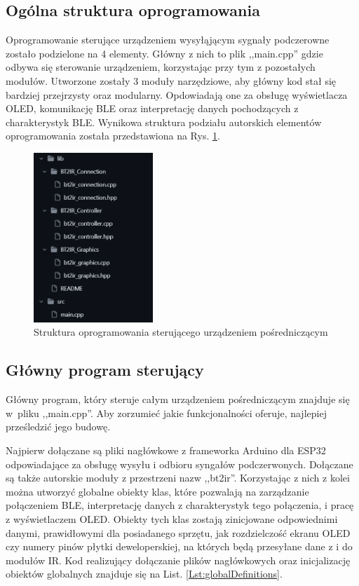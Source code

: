 \documentclass[12pt,twoside]{article}
\begin{document}
\subsection{Ogólna struktura oprogramowania}
Oprogramowanie sterujące urządzeniem wysyłąjącym sygnały podczerowne zostało podzielone na 4 elementy. Główny z nich to plik ,,main.cpp'' gdzie odbywa się sterowanie urządzeniem, korzystając przy tym z pozostałych modułów. Utworzone zostały 3 moduły narzędziowe, aby główny kod stał się bardziej przejrzysty oraz modularny. Opdowiadają one za obsługę wyświetlacza OLED, komunikację BLE oraz interpretację danych pochodzących z charakterystyk BLE. Wynikowa struktura podziału autorskich elementów oprogramowania została przedstawiona na Rys. \ref*{Fig:codeStructure}.
\begin{figure}[ht]
   \centering
   \includegraphics[width=4.5cm]{images/codeStructure.png}
   \caption{Struktura oprogramowania sterującego urządzeniem pośredniczącym}
   \label{Fig:codeStructure}
\end{figure}

\subsection{Główny program sterujący}
Główny program, który steruje całym urządzeniem pośredniczącym znajduje się w~pliku ,,main.cpp''. Aby zorzumieć jakie funkcjonalności oferuje, najlepiej prześledzić jego budowę.

Najpierw dołączane są pliki nagłówkowe z frameworka Arduino dla ESP32 odpowiadające za obsługę wysyłu i odbioru syngałów podczerwonych. Dołączane są także autorskie moduły z przestrzeni nazw ,,bt2ir''. Korzystając z nich z kolei można utworzyć globalne obiekty klas, które pozwalają na zarządzanie połączeniem BLE, interpretację danych z charakterystyk tego połączenia, i pracę z  wyświetlaczem OLED. Obiekty tych klas zostają zinicjowane odpowiednimi danymi, prawidłowymi dla posiadanego sprzętu, jak rozdzielczość ekranu OLED czy numery pinów płytki deweloperskiej, na których będą przesyłane dane z i do modułów IR. Kod realizujący dołączanie plików nagłówkowych oraz inicjalizację obiektów globalnych znajduje się na List. \ref{Lst:globalDefinitions}.
\end{document}
